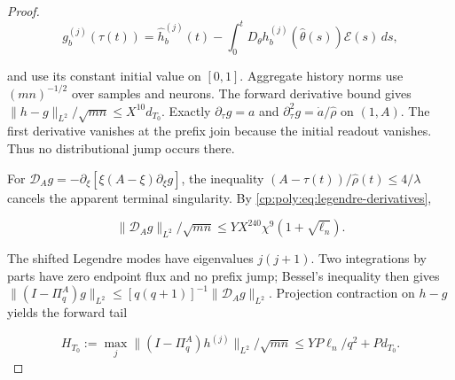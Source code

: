 \begin{proof}
\[
g_b^{(j)}(\tau(t))=\widehat h_b^{(j)}(t)
 -\int_0^tD_\theta h_b^{(j)}(\widehat\theta(s))\mathcal E(s)\,ds,
\]

and use its constant initial value on $[0,1]$. Aggregate history norms
use $(mn)^{-1/2}$ over samples and neurons. The forward derivative bound
gives $\|h-g\|_{L^2}/\sqrt{mn}\le X^{10}d_{T_0}$.
Exactly $\partial_\tau g=a$ and
$\partial_\tau^2g=\dot a/\widehat\rho$ on $(1,A)$.
The first derivative vanishes at the prefix join because the initial
readout vanishes. Thus no distributional jump occurs there.

For $\mathscr D_Ag=-\partial_\xi[\xi(A-\xi)\partial_\xi g]$,
the inequality $(A-\tau(t))/\widehat\rho(t)\le4/\lambda$ cancels
the apparent terminal singularity. By
\eqref{cp:poly:eq:legendre-derivatives},

\[
\|\mathscr D_Ag\|_{L^2}/\sqrt{mn}
 \le YX^{240}\chi^9(1+\sqrt{\ell_n}).
\]

The shifted Legendre modes have eigenvalues $j(j+1)$.
Two integrations by parts have zero endpoint flux and no prefix jump;
Bessel's inequality then gives
$\|(I-\Pi_q^A)g\|_{L^2}\le[q(q+1)]^{-1}\|\mathscr D_Ag\|_{L^2}$.
Projection contraction on $h-g$ yields the forward tail

\[
H_{T_0}:=\max_j\|(I-\Pi_q^A)h^{(j)}\|_{L^2}/\sqrt{mn}
 \le YP\ell_n/q^2+Pd_{T_0}.
\]


\end{proof}
